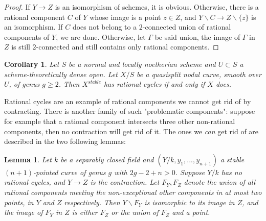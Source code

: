 \documentclass[a4paper,12pt]{amsart} %
\numberwithin{equation}{subsection}
\theoremstyle{definition}
\theoremstyle{plain}%
\newtheorem{lemma}[definition]{Lemma}
\newtheorem{corollary}[definition]{Corollary}
\theoremstyle{remark}
\begin{document}
\begin{proof}
If $Y\to Z$ is an isomorphism of schemes, it is obvious. Otherwise, there is a rational component $C$ of $Y$ whose image is a point $z\in Z$, and $Y\backslash C\to Z\backslash \{z\}$ is an isomorphism. If $C$ does not belong to a $2$-connected union of rational components of $Y$, we are done. Otherwise, let $\Gamma$ be said union, the image of $\Gamma$ in $Z$ is still $2$-connected and still contains only rational components.
\end{proof}

\begin{corollary}\label{corollary X^stable has rational cycles iff X does}
Let $S$ be a normal and locally noetherian scheme and $U\subset S$ a scheme-theoretically dense open. Let $X/S$ be a quasisplit nodal curve, smooth over $U$, of genus $g\geq 2$. Then $X^{stable}$ has rational cycles if and only if $X$ does.
\end{corollary}

Rational cycles are an example of rational components we cannot get rid of by contracting. There is another family of such "problematic components": suppose for example that a rational component intersects three other non-rational components, then no contraction will get rid of it. The ones we \emph{can} get rid of are described in the two following lemmas:

\begin{lemma}
Let $k$ be a separably closed field and $(Y/k,y_1,...,y_{n+1})$ a stable $(n+1)$-pointed curve of genus $g$ with $2g-2+n>0$. Suppose $Y/k$ has no rational cycles, and $Y\to Z$ is the contraction. Let $F_Y,F_Z$ denote the union of all rational components meeting the non-exceptional other components in at most two points, in $Y$ and $Z$ respectively. Then $Y\backslash F_Y$ is isomorphic to its image in $Z$, and the image of $F_Y$ in $Z$ is either $F_Z$ or the union of $F_Z$ and a point.
\end{lemma}
\end{document}
